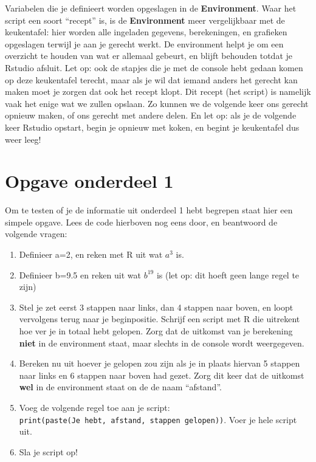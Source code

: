 \documentclass[
  b5paper,
  DIV=11,
  numbers=noendperiod]{scrreprt}
\providecommand{\tightlist}{%
  \setlength{\itemsep}{0pt}\setlength{\parskip}{0pt}}\usepackage{longtable,booktabs,array}
\theoremstyle{definition}
\theoremstyle{remark}
\begin{document}
Variabelen die je definieert worden opgeslagen in de
\textbf{Environment}. Waar het script een soort ``recept'' is, is de
\textbf{Environment} meer vergelijkbaar met de keukentafel: hier worden
alle ingeladen gegevens, berekeningen, en grafieken opgeslagen terwijl
je aan je gerecht werkt. De environment helpt je om een overzicht te
houden van wat er allemaal gebeurt, en blijft behouden totdat je Rstudio
afsluit. Let op: ook de stapjes die je met de console hebt gedaan komen
op deze keukentafel terecht, maar als je wil dat iemand anders het
gerecht kan maken moet je zorgen dat ook het recept klopt. Dit recept
(het script) is namelijk vaak het enige wat we zullen opslaan. Zo kunnen
we de volgende keer ons gerecht opnieuw maken, of ons gerecht met andere
delen. En let op: als je de volgende keer Rstudio opstart, begin je
opnieuw met koken, en begint je keukentafel dus weer leeg!

\section{Opgave onderdeel 1}\label{opgave-onderdeel-1}

Om te testen of je de informatie uit onderdeel 1 hebt begrepen staat
hier een simpele opgave. Lees de code hierboven nog eens door, en
beantwoord de volgende vragen:

\begin{enumerate}
\def\labelenumi{\arabic{enumi}.}
\tightlist
\item
  Definieer a=2, en reken met R uit wat \(a^3\) is.
\item
  Definieer b=9.5 en reken uit wat \(b^{19}\) is (let op: dit hoeft geen
  lange regel te zijn)
\item
  Stel je zet eerst 3 stappen naar links, dan 4 stappen naar boven, en
  loopt vervolgens terug naar je beginpositie. Schrijf een script met R
  die uitrekent hoe ver je in totaal hebt gelopen. Zorg dat de uitkomst
  van je berekening \textbf{niet} in de environment staat, maar slechts
  in de console wordt weergegeven.
\item
  Bereken nu uit hoever je gelopen zou zijn als je in plaats hiervan 5
  stappen naar links en 6 stappen naar boven had gezet. Zorg dit keer
  dat de uitkomst \textbf{wel} in de environment staat on de de naam
  ``afstand''.
\item
  Voeg de volgende regel toe aan je script:\\
  \texttt{print(paste(\textquotesingle{}Je\ hebt\textquotesingle{},\ afstand,\ \textquotesingle{}stappen\ gelopen\textquotesingle{}))}.
  Voer je hele script uit.
\item
  Sla je script op!
\end{enumerate}
\end{document}
